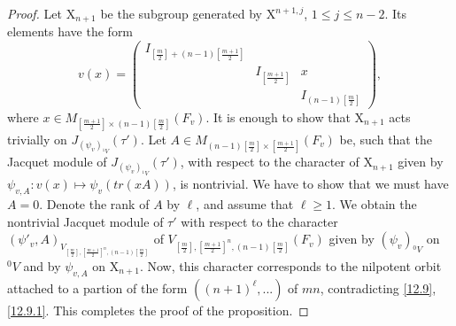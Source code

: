 \documentclass[12pts]{amsart}
\begin{document}
\begin{proof}
Let $\mathrm{X}_{n+1}$ be the subgroup generated by $\mathrm{X}^{n+1,j}$, $1\leq j\leq n-2$. Its elements have the form
$$
v(x)=\begin{pmatrix}I_{[\frac{m}{2}]+(n-1)[\frac{m+1}{2}]}\\&I_{[\frac{m+1}{2}]}&x\\&&I_{(n-1)[\frac{m}{2}]}\end{pmatrix},
$$
where $x\in M_{[\frac{m+1}{2}]\times (n-1)[\frac{m}{2}]}(F_v)$. It is enough to show that $\mathrm{X}_{n+1}$ acts trivially on $J_{(\psi_v)_{{}^1V}}(\tau')$. Let $A\in M_{(n-1)[\frac{m}{2}]\times [\frac{m+1}{2}]}(F_v)$ be, such that the Jacquet module of $J_{(\psi_v)_{{}^1V}}(\tau')$, with respect to the character of $\mathrm{X}_{n+1}$ given by $\psi_{v,A}: v(x)\mapsto \psi_v(tr(xA))$, is nontrivial. We have to show that we must have $A=0$. Denote the rank of $A$ by $\ell$, and assume that $\ell\geq 1$. We obtain the nontrivial Jacquet module of $\tau'$ with respect to the character $(\psi'{_v,A})_{V_{[\frac{m}{2}], [\frac{m+1}{2}]^n,(n-1)[\frac{m}{2}]}}$ of $V_{[\frac{m}{2}], [\frac{m+1}{2}]^n,(n-1)[\frac{m}{2}]}(F_v)$ given by $(\psi_v)_{{}^0V}$ on ${}^0V$ and by $\psi_{v,A}$ on $\mathrm{X}_{n+1}$. Now, this character corresponds to the nilpotent orbit attached to a partion of the form $((n+1)^\ell,...)$ of $mn$, contradicting \eqref{12.9}, \eqref{12.9.1}. This completes the proof of the proposition.

\end{proof}
\end{document}
